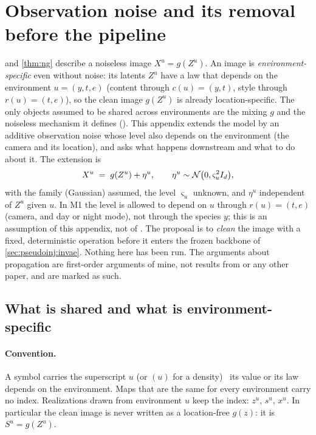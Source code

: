 \section{Observation noise and its removal before the pipeline}
\label{app:noise}

 and \cref{thm:ng} describe a noiseless image $X^u=g(Z^u)$. An image is
\emph{environment-specific} even without noise: its latents $Z^u$ have a law that depends on the
environment $u=(y,t,e)$ (content through $c(u)=(y,t)$, style through $r(u)=(t,e)$), so the clean image
$g(Z^u)$ is already location-specific. The only objects assumed to be shared across environments are the
mixing $g$ and the noiseless mechanism it defines (). This appendix extends
the model by an additive observation noise whose level also depends on the environment (the camera and
its location), and asks what happens downstream and what to do about it. The extension is
\begin{equation}
X^u \;=\; g(Z^u)+\eta^u,\qquad \eta^u\sim\mathcal{N}\bigl(0,\varsigma_u^2 I_d\bigr),
\label{eq:noise-obs}
\end{equation}
with the family (Gaussian) assumed, the level $\varsigma_u$ unknown, and $\eta^u$ independent of $Z^u$
given $u$. In M1 the level is allowed to depend on $u$ through $r(u)=(t,e)$ (camera, and day or night
mode), not through the species $y$; this is an assumption of this appendix, not of \cite{ng2025}.
The proposal is to \emph{clean} the image with a fixed, deterministic operation before it enters the
frozen backbone of \cref{sec:pseudoinj:invae}. Nothing here has been run. The arguments about
propagation are first-order arguments of mine, not results from \cite{ng2025} or any other paper, and
are marked as such.

\subsection{What is shared and what is environment-specific}
\label{app:noise:inv}
\paragraph{Convention.} A symbol carries the superscript $u$ (or $(u)$ for a density) \ifft\ 
its value or its law depends on the environment. Maps that are the same for every environment carry no
index. Realizations drawn from environment $u$ keep the index: $z^u$, $s^u$, $x^u$.
In particular the clean image is never written as a location-free $g(z)$: it is $S^u=g(Z^u)$.


